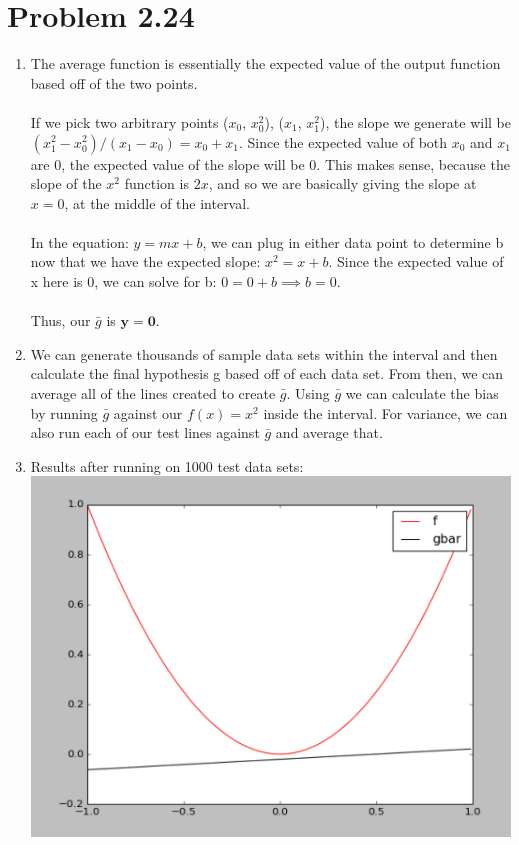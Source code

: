 \documentclass[12pt]{article}
\begin{document}
\section*{Problem 2.24}
\begin{enumerate}[label=(\alph*)]
	\item The average function is essentially the expected value of the output function based off of the two points.
	\\ \\ If we pick two arbitrary points ($x_0$, $x_0^2$), ($x_1$, $x_1^2$), the slope we generate will be $(x_1^2 - x_0^2)/(x_1 - x_0) = x_0 + x_1$. Since the expected value of both $x_0$ and $x_1$ are 0, the expected value of the slope will be $0$. This makes sense, because the slope of the $x^2$ function is $2x$, and so we are basically giving the slope at $x = 0$, at the middle of the interval.
	\\ \\ In the equation: $y = mx + b$, we can plug in either data point to determine b now that we have the expected slope: $x^2 = x + b$. Since the expected value of x here is 0, we can solve for b: $0 = 0 + b \implies b = 0$.
	\\ \\ Thus, our $\bar{g}$ is $\boldsymbol{y = 0}$.
	\item We can generate thousands of sample data sets within the interval and then calculate the final hypothesis g based off of each data set. From then, we can average all of the lines created to create $\bar{g}$. Using $\bar{g}$ we can calculate the bias by running $\bar{g}$ against our $f(x) = x^2$ inside the interval. For variance, we can also run each of our test lines against $\bar{g}$ and average that.
	\item Results after running on 1000 test data sets: 
	\\ \includegraphics[scale=.5]{2-24.png}

\end{enumerate}
\end{document}
